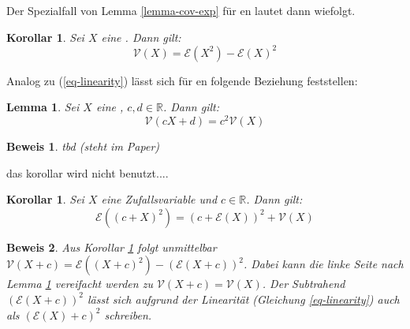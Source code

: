 \documentclass[a4paper]{article}
\newtheorem{korollar}[satz]{Korollar}
\newtheorem{lemma}[satz]{Lemma}
\theoremstyle{nonumberplain}
\newtheorem{beweis}{Beweis}
\begin{document}
Der Spezialfall von Lemma \ref{lemma-cov-exp} für \var{}en lautet dann wiefolgt.

\begin{korollar}\label{kor-var-exp}
	Sei $X$ eine \rvar{}. Dann gilt:
	\begin{equation}
		\mathcal{V}(X) = \mathcal{E}(X^{2}) - \mathcal{E}\left(X\right)^{2}
	\end{equation}
\end{korollar}
Analog zu (\ref{eq-linearity}) lässt sich für \var{}en folgende Beziehung feststellen:
\begin{lemma}\label{lemma-var-qlinear}
	Sei $X$ eine \rvar{}, $c,d \in \mathbb{R}$. Dann gilt:
	\begin{equation}
		\mathcal{V}(cX + d) = c^2\mathcal{V}(X)
	\end{equation}
\end{lemma}
\begin{beweis}
	tbd (steht im Paper)
\end{beweis}
\begin{meta}
	das korollar wird nicht benutzt....
\end{meta}
\begin{korollar}
	Sei $X$ eine Zufallsvariable und $c \in \mathbb{R}$. Dann gilt:
	\begin{equation}
		\mathcal{E}\left((c+X)^2\right) = (c+ \mathcal{E}(X))^2 + \mathcal{V}(X)
	\end{equation}
\end{korollar}
\begin{beweis}
Aus Korollar \ref{kor-var-exp} folgt unmittelbar $\mathcal{V}(X+c) = \mathcal{E}\left((X+c)^{2}\right) - \left(\mathcal{E}\left(X+c\right)\right)^{2}$. Dabei kann die linke Seite nach Lemma \ref{lemma-var-qlinear} vereifacht werden zu $\mathcal{V}(X+c) = \mathcal{V}(X)$. Der Subtrahend $\left(\mathcal{E}\left(X+c\right)\right)^{2}$ lässt sich aufgrund der Linearität (Gleichung \ref{eq-linearity}) auch als $\left( \mathcal{E}(X)+c\right)^{2}$ 
schreiben.
\end{beweis}
\end{document}
